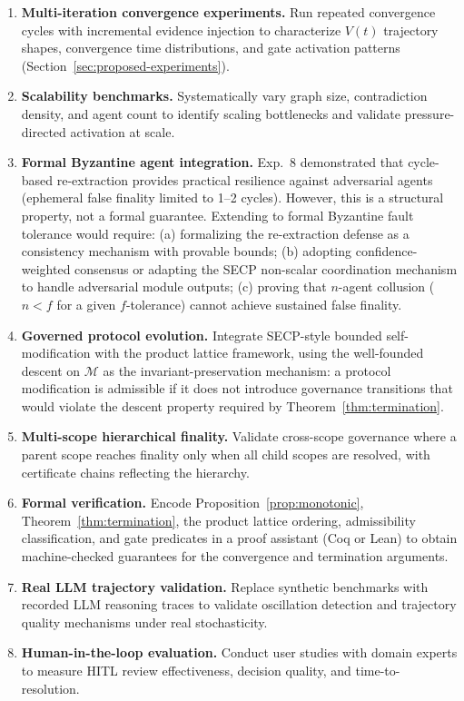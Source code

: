 \documentclass[11pt]{article}
\begin{document}
\begin{enumerate}
  \item \textbf{Multi-iteration convergence experiments.} Run repeated convergence cycles with incremental evidence injection to characterize $V(t)$ trajectory shapes, convergence time distributions, and gate activation patterns (Section~\ref{sec:proposed-experiments}).
  \item \textbf{Scalability benchmarks.} Systematically vary graph size, contradiction density, and agent count to identify scaling bottlenecks and validate pressure-directed activation at scale.
  \item \textbf{Formal Byzantine agent integration.} Exp.~8 demonstrated that cycle-based re-extraction provides practical resilience against adversarial agents (ephemeral false finality limited to 1--2 cycles). However, this is a structural property, not a formal guarantee. Extending to formal Byzantine fault tolerance would require: (a) formalizing the re-extraction defense as a consistency mechanism with provable bounds; (b) adopting confidence-weighted consensus \cite{zheng2025} or adapting the SECP non-scalar coordination mechanism to handle adversarial module outputs; (c) proving that $n$-agent collusion ($n < f$ for a given $f$-tolerance) cannot achieve sustained false finality.
  \item \textbf{Governed protocol evolution.} Integrate SECP-style bounded self-modification \cite{delachica2026} with the product lattice framework, using the well-founded descent on $\mathcal{M}$ as the invariant-preservation mechanism: a protocol modification is admissible if it does not introduce governance transitions that would violate the descent property required by Theorem~\ref{thm:termination}.
  \item \textbf{Multi-scope hierarchical finality.} Validate cross-scope governance where a parent scope reaches finality only when all child scopes are resolved, with certificate chains reflecting the hierarchy.
  \item \textbf{Formal verification.} Encode Proposition~\ref{prop:monotonic}, Theorem~\ref{thm:termination}, the product lattice ordering, admissibility classification, and gate predicates in a proof assistant (Coq or Lean) to obtain machine-checked guarantees for the convergence and termination arguments.
  \item \textbf{Real LLM trajectory validation.} Replace synthetic benchmarks with recorded LLM reasoning traces to validate oscillation detection and trajectory quality mechanisms under real stochasticity.
  \item \textbf{Human-in-the-loop evaluation.} Conduct user studies with domain experts to measure HITL review effectiveness, decision quality, and time-to-resolution.
\end{enumerate}
\end{document}
